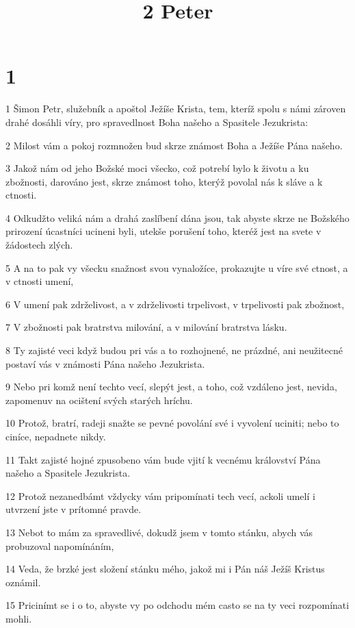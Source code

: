 

\title{2 Peter}

\chapter{1}

\par 1 Šimon Petr, služebník a apoštol Ježíše Krista, tem, kteríž spolu s námi zároven drahé dosáhli víry, pro spravedlnost Boha našeho a Spasitele Jezukrista:
\par 2 Milost vám a pokoj rozmnožen bud skrze známost Boha a Ježíše Pána našeho.
\par 3 Jakož nám od jeho Božské moci všecko, což potrebí bylo k životu a ku zbožnosti, darováno jest, skrze známost toho, kterýž povolal nás k sláve a k ctnosti.
\par 4 Odkudžto veliká nám a drahá zaslíbení dána jsou, tak abyste skrze ne Božského prirození úcastníci ucineni byli, utekše porušení toho, kteréž jest na svete v žádostech zlých.
\par 5 A na to pak vy všecku snažnost svou vynaložíce, prokazujte u víre své ctnost, a v ctnosti umení,
\par 6 V umení pak zdrželivost, a v zdrželivosti trpelivost, v trpelivosti pak zbožnost,
\par 7 V zbožnosti pak bratrstva milování, a v milování bratrstva lásku.
\par 8 Ty zajisté veci když budou pri vás a to rozhojnené, ne prázdné, ani neužitecné postaví vás v známosti Pána našeho Jezukrista.
\par 9 Nebo pri komž není techto vecí, slepýt jest, a toho, což vzdáleno jest, nevida, zapomenuv na ocištení svých starých hríchu.
\par 10 Protož, bratrí, radeji snažte se pevné povolání své i vyvolení uciniti; nebo to ciníce, nepadnete nikdy.
\par 11 Takt zajisté hojné zpusobeno vám bude vjití k vecnému království Pána našeho a Spasitele Jezukrista.
\par 12 Protož nezanedbámt vždycky vám pripomínati tech vecí, ackoli umelí i utvrzení jste v prítomné pravde.
\par 13 Nebot to mám za spravedlivé, dokudž jsem v tomto stánku, abych vás probuzoval napomínáním,
\par 14 Veda, že brzké jest složení stánku mého, jakož mi i Pán náš Ježíš Kristus oznámil.
\par 15 Pricinímt se i o to, abyste vy po odchodu mém casto se na ty veci rozpomínati mohli.
